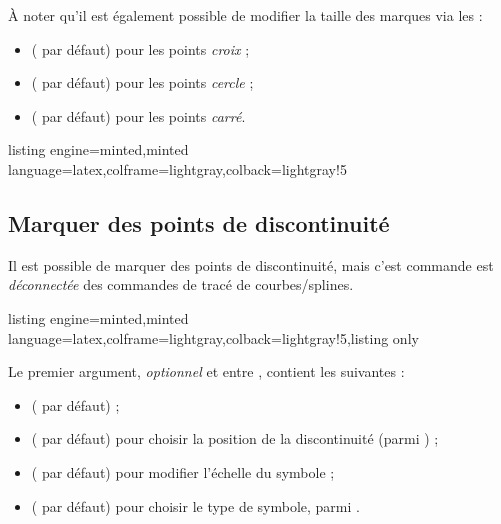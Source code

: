 \documentclass[11pt,a4paper]{ltxdoc}
\begin{document}
À noter qu'il est également possible de modifier la taille des marques  via les \MontreCode{[clés]} :

\begin{itemize}
	\item {} (\MontreCode{2pt} par défaut) pour les points \textit{croix} ;
	\item {} (\MontreCode{1.75pt} par défaut) pour les points \textit{cercle} ;
	\item {} (\MontreCode{2pt} par défaut) pour les points \textit{carré}.
\end{itemize}

\pagebreak

\begin{tcblisting}{listing engine=minted,minted language=latex,colframe=lightgray,colback=lightgray!5}
\begin{GraphiqueTikz}[x=1cm,y=1cm,Xmin=0,Ymin=0]
\end{GraphiqueTikz}
\end{tcblisting}

\subsection{Marquer des points de discontinuité}\label{ptsdiscont}

Il est possible de marquer des points de discontinuité, mais c'est commande est \textit{déconnectée} des commandes de tracé de courbes/splines.

\begin{tcblisting}{listing engine=minted,minted language=latex,colframe=lightgray,colback=lightgray!5,listing only}
\end{tcblisting}

Le premier argument, \textit{optionnel} et entre \MontreCode{[...]}, contient les  suivantes :

\begin{itemize}
	\item {} ( par défaut) ;
	\item {} ( par défaut) pour choisir la position de la discontinuité (parmi ) ;
	\item {} ( par défaut) pour modifier l'échelle du symbole ;
	\item {} ( par défaut) pour choisir le type de symbole, parmi .
\end{itemize}
\end{document}
